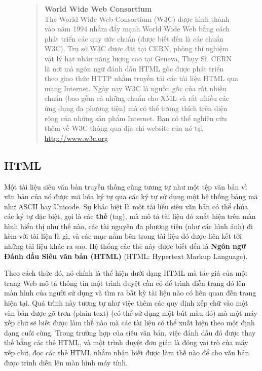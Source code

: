 \begin{figure}[t]
  \begin{quotation}
    \noindent
    \textbf{World Wide Web Consortium} \vspace{0.3cm}
    \\
    The World Wide Web Consortium (W3C) được hình thành vào năm 1994 nhằm đẩy mạnh World
    Wide Web bằng cách phát triển các quy ước chuẩn (được biết đến là các chuẩn W3C). Trụ
    sở W3C được đặt tại CERN, phòng thí nghiệm vật lý hạt nhân năng lượng cao tại Geneva,
    Thụy Sĩ. CERN là nơi mà ngôn ngữ đánh dấu HTML gốc được phát triển theo giao thức HTTP
    nhằm truyền tải các tài liệu HTML qua mạng Internet. Ngày nay W3C là nguồn gốc của rất
    nhiều chuẩn (bao gồm cả những chuẩn cho XML và rất nhiều các ứng dụng đa phương tiện)
    mà có thể tương thích trên diện rộng của những sản phẩm Internet. Bạn có thể nghiên
    cứu thêm về W3C thông qua địa chỉ website của nó tại \url{http://www.w3c.org}
  \end{quotation}
\end{figure}

\subsection*{HTML}
Một tài liệu siêu văn bản truyền thống cũng tương tự như một tệp văn bản vì văn bản của nó
được mã hóa ký tự qua các ký tự sử dụng một hệ thống bảng mã như ASCII hay Unicode. Sự
khác biệt là một tài liệu siêu văn bản có thể chứa các ký tự đặc biệt, gọi là các
\textbf{thẻ} (tag), mà mô tả tài liệu đó xuất hiện trên màn hình hiển thị như thế nào, các
tài nguyên đa phương tiện (như các hình ảnh) đi kèm với tài liệu là gì, và các mục nằm bên
trong tài liệu đó được liên kết tới những tài liệu khác ra sao. Hệ thống các thẻ này được
biết đến là \textbf{Ngôn ngữ Đánh dấu Siêu văn bản (HTML)} (HTML: Hypertext Markup
Language).

Theo cách thức đó, nó chính là thể hiện dưới dạng HTML mà tác giả của một trang Web mô tả
thông tin một trình duyệt cần có để trình diễn trang đó lên màn hình của người sử dụng
và tìm ra bất kỳ tài liệu nào có liên quan đến trang hiện tại. Quá trình này tương tự như
việc thêm các quy định xếp chữ vào một văn bản được gõ trơn (plain text) (có thể sử dụng
một bút màu đỏ) mà một máy xếp chữ sẽ biết được làm thế nào mà các tài liệu có thể xuất
hiện theo một định dạng cuối cùng. Trong trường hợp của siêu văn bản, việc đánh dấu đỏ
được thay thế bằng các thẻ HTML, và một trình duyệt đơn giản là đóng vai trò của máy xếp
chữ, đọc các thẻ HTML nhằm nhận biết được làm thế nào để cho văn bản được trình diễn lên
màn hình máy tính.

